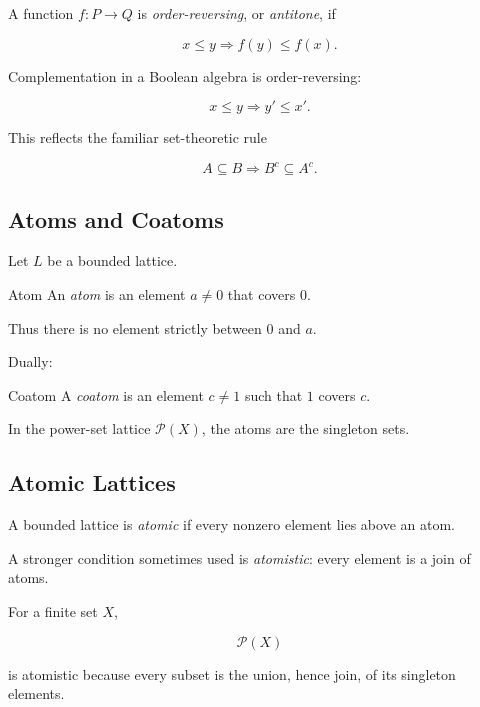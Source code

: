 A function \(f:P\to Q\) is \emph{order-reversing}, or \emph{antitone}, if

\[ x\leq y\Longrightarrow f(y)\leq f(x). \]

Complementation in a Boolean algebra is order-reversing:

\[ x\leq y\Longrightarrow y'\leq x'. \]

This reflects the familiar set-theoretic rule

\[ A\subseteq B\Longrightarrow B^c\subseteq A^c. \]

\subsection{Atoms and Coatoms}
\label{subsec:atoms-coatoms}

Let \(L\) be a bounded lattice.

\begin{definitionbox}{Atom}
An \emph{atom} is an element \(a\neq0\) that covers \(0\).
\end{definitionbox}

Thus there is no element strictly between \(0\) and \(a\).

Dually:

\begin{definitionbox}{Coatom}
A \emph{coatom} is an element \(c\neq1\) such that \(1\) covers \(c\).
\end{definitionbox}

In the power-set lattice \(\mathcal P(X)\), the atoms are the singleton
sets.

\subsection{Atomic Lattices}
\label{subsec:atomic-lattices}

A bounded lattice is \emph{atomic} if every nonzero element lies above an
atom.

A stronger condition sometimes used is \emph{atomistic}: every element is
a join of atoms.

For a finite set \(X\),

\[ \mathcal P(X) \]

is atomistic because every subset is the union, hence join, of its singleton
elements.

